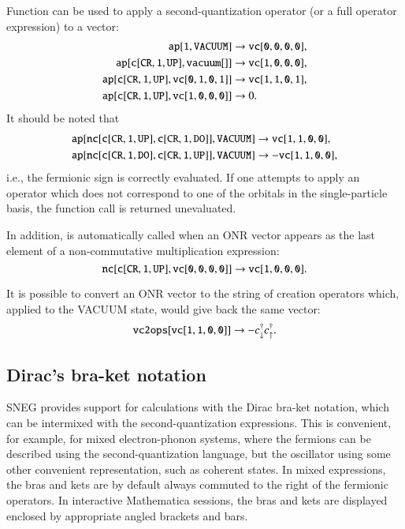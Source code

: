 \documentclass[3p,number,preprint]{elsarticle}
\begin{document}
Function  can be used to apply a second-quantization operator
(or a full operator expression) to a vector:
%
\begin{equation}
\begin{split}
{\tt ap[1, VACUUM]} &\to {\tt vc[0,0,0,0]}, \\
{\tt ap[c[CR,1,UP],vacuum[]]} &\to {\tt vc[1,0,0,0]}, \\
{\tt ap[c[CR,1,UP],vc[0,1,0,1]]} &\to {\tt vc[1,1,0,1]}, \\
{\tt ap[c[CR,1,UP],vc[1,0,0,0]]} &\to 0.
\end{split}
\end{equation}
%
It should be noted that
%
\begin{equation}
\begin{split}
{\tt ap[nc[c[CR, 1, UP], c[CR, 1, DO]], VACUUM]} &\to {\tt vc[1,1,0,0]}, \\
{\tt ap[nc[c[CR, 1, DO], c[CR, 1, UP]], VACUUM]} &\to -{\tt vc[1,1,0,0]},
\end{split}
\end{equation}
%
i.e., the fermionic sign is correctly evaluated. If one attempts to
apply an operator which does not correspond to one of the orbitals in
the single-particle basis, the function call is returned unevaluated.

In addition,  is automatically called when an ONR vector
appears as the last element of a non-commutative multiplication
expression:
%
\begin{equation}
{\tt nc[c[CR,1,UP],vc[0,0,0,0]]} \to {\tt vc[1,0,0,0]}.
\end{equation}

It is possible to convert an ONR vector to the string of creation
operators which, applied to the VACUUM state, would give back the same
vector:
%
\begin{equation}
{\tt vc2ops[vc[1,1,0,0]]} \to -c^\dag_\downarrow c^\dag_\uparrow.
\end{equation}

\subsection{Dirac's bra-ket notation}

SNEG provides support for calculations with the Dirac bra-ket
notation, which can be intermixed with the second-quantization
expressions. This is convenient, for example, for mixed
electron-phonon systems, where the fermions can be described using the
second-quantization language, but the oscillator using some other
convenient representation, such as coherent states. In mixed
expressions, the bras and kets are by default always commuted to the
right of the fermionic operators. In interactive Mathematica sessions,
the bras and kets are displayed enclosed by appropriate angled
brackets and bars.
\end{document}
